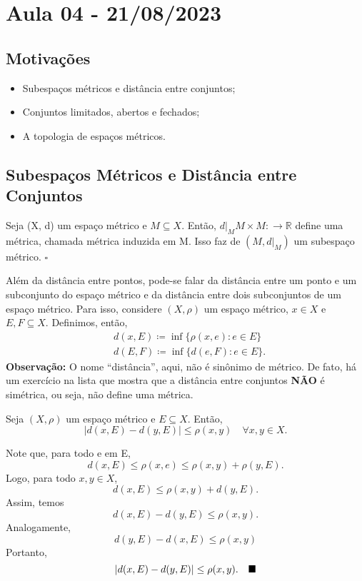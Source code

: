 \documentclass[metric_notes.tex]{subfiles}
\begin{document}
\section{Aula 04 - 21/08/2023}
\subsection{Motivações}
\begin{itemize}
	\item Subespaços métricos e distância entre conjuntos;
	\item Conjuntos limitados, abertos e fechados;
	\item A topologia de espaços métricos.
\end{itemize}
\subsection{Subespaços Métricos e Distância entre Conjuntos}
\begin{def*}
	Seja (X, d) um espaço métrico e \(M\subseteq{X}.\) Então, \(d|_{M}M\times M:\rightarrow \mathbb{R}\)
	define uma métrica, chamada métrica induzida em M. Isso faz de \((M, d|_M)\) um subespaço métrico. \(\square\)
\end{def*}
Além da distância entre pontos, pode-se falar da distância entre um ponto e um subconjunto do espaço métrico
e da distância entre dois subconjuntos de um espaço métrico. Para isso, considere \((X, \rho )\) um espaço métrico,
\(x\in X\) e \(E, F\subseteq{X}.\) Definimos, então,
\begin{align*}
	 & d(x, E)\coloneqq \inf\{\rho (x, e): e\in E\} \\
	 & d(E, F)\coloneqq \inf\{d(e, F): e\in E\}.
\end{align*}
\textbf{Observação:} O nome ``distância'', aqui, não é sinônimo de métrico. De fato, há um exercício na lista que mostra que a distância entre conjuntos
\textbf{NÃO} é simétrica, ou seja, não define uma métrica.
\begin{prop*}
	Seja \((X, \rho )\) um espaço métrico e \(E\subseteq{X}.\) Então,
	\[
		|d(x, E) - d(y, E)|\leq \rho (x, y) \quad \forall x, y\in X.
	\]
\end{prop*}
\begin{proof*}
	Note que, para todo e em E,
	\[
		d(x, E)\leq \rho (x, e)\leq \rho (x, y) + \rho (y, E).
	\]
	Logo, para todo \(x, y\in X\),
	\[
		d(x, E)\leq \rho (x, y) + d(y, E).
	\]
	Assim, temos
	\[
		d(x, E) - d(y, E)\leq \rho (x, y).
	\]
	Analogamente,
	\[
		d(y, E) - d(x, E)\leq \rho (x, y)
	\]
	Portanto,
	\[
		|d(x, E) - d(y, E)|\leq \rho (x, y).\quad\text{$\blacksquare$}
	\]
\end{proof*}
\end{document}
